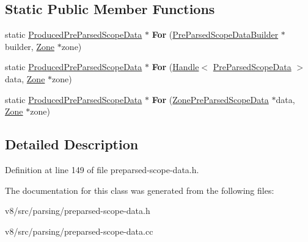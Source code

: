 \subsection*{Static Public Member Functions}
\begin{DoxyCompactItemize}
\item 
\mbox{\label{classv8_1_1internal_1_1ProducedPreParsedScopeData_adead9298a9c3101376de5093d8255dad}} 
static \mbox{\hyperlink{classv8_1_1internal_1_1ProducedPreParsedScopeData}{Produced\+Pre\+Parsed\+Scope\+Data}} $\ast$ {\bfseries For} (\mbox{\hyperlink{classv8_1_1internal_1_1PreParsedScopeDataBuilder}{Pre\+Parsed\+Scope\+Data\+Builder}} $\ast$builder, \mbox{\hyperlink{classv8_1_1internal_1_1Zone}{Zone}} $\ast$zone)
\item 
\mbox{\label{classv8_1_1internal_1_1ProducedPreParsedScopeData_aa8a171127d4f46254ba5618fc9a55183}} 
static \mbox{\hyperlink{classv8_1_1internal_1_1ProducedPreParsedScopeData}{Produced\+Pre\+Parsed\+Scope\+Data}} $\ast$ {\bfseries For} (\mbox{\hyperlink{classv8_1_1internal_1_1Handle}{Handle}}$<$ \mbox{\hyperlink{classv8_1_1internal_1_1PreParsedScopeData}{Pre\+Parsed\+Scope\+Data}} $>$ data, \mbox{\hyperlink{classv8_1_1internal_1_1Zone}{Zone}} $\ast$zone)
\item 
\mbox{\label{classv8_1_1internal_1_1ProducedPreParsedScopeData_afaf666de44d6494c5539b6b5ee5513f1}} 
static \mbox{\hyperlink{classv8_1_1internal_1_1ProducedPreParsedScopeData}{Produced\+Pre\+Parsed\+Scope\+Data}} $\ast$ {\bfseries For} (\mbox{\hyperlink{classv8_1_1internal_1_1ZonePreParsedScopeData}{Zone\+Pre\+Parsed\+Scope\+Data}} $\ast$data, \mbox{\hyperlink{classv8_1_1internal_1_1Zone}{Zone}} $\ast$zone)
\end{DoxyCompactItemize}


\subsection{Detailed Description}


Definition at line 149 of file preparsed-\/scope-\/data.\+h.



The documentation for this class was generated from the following files\+:\begin{DoxyCompactItemize}
\item 
v8/src/parsing/preparsed-\/scope-\/data.\+h\item 
v8/src/parsing/preparsed-\/scope-\/data.\+cc\end{DoxyCompactItemize}
